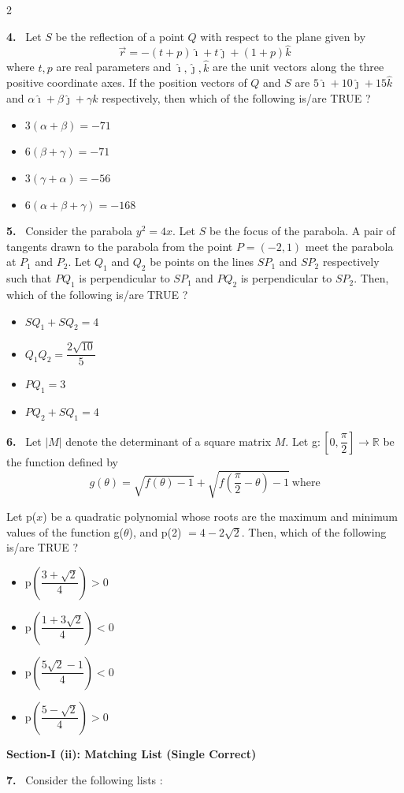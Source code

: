 \documentclass[10pt]{extarticle}
\newcommand{\sect}[1]{\par\smallskip\noindent\textbf{#1}\par}
\newcommand{\qn}[1]{\par\smallskip\noindent\textbf{#1.}~}
\newenvironment{qoptions}{\begin{itemize}[leftmargin=1.8em,itemsep=1pt,topsep=2pt,label={}]}{\end{itemize}}
\newcommand{\opt}[2]{\item[(#1)] #2}
\begin{document}
\begin{multicols}{2}
\qn{4} Let $S$ be the reflection of a point $Q$ with respect to the plane given by
\[\vec r = -(t+p)\hat\imath + t\hat\jmath + (1+p)\hat k\]
where $t,p$ are real parameters and $\hat\imath,\hat\jmath,\hat k$ are the unit vectors along the three positive coordinate axes. If the position vectors of $Q$ and $S$ are $5\hat\imath+10\hat\jmath+15\hat k$ and $\alpha\hat\imath+\beta\hat\jmath+\gamma\hat k$ respectively, then which of the following is/are TRUE ?
\begin{qoptions}
\opt{A}{$3(\alpha+\beta) = -71$}
\opt{B}{$6(\beta+\gamma) = -71$}
\opt{C}{$3(\gamma+\alpha) = -56$}
\opt{D}{$6(\alpha+\beta+\gamma) = -168$}
\end{qoptions}

\qn{5} Consider the parabola $y^2=4x$. Let $S$ be the focus of the parabola. A pair of tangents drawn to the parabola from the point $P=(-2,1)$ meet the parabola at $P_1$ and $P_2$. Let $Q_1$ and $Q_2$ be points on the lines $SP_1$ and $SP_2$ respectively such that $PQ_1$ is perpendicular to $SP_1$ and $PQ_2$ is perpendicular to $SP_2$. Then, which of the following is/are TRUE ?
\begin{qoptions}
\opt{A}{$SQ_1+SQ_2 = 4$}
\opt{B}{$Q_1Q_2 = \dfrac{2\sqrt{10}}{5}$}
\opt{C}{$PQ_1 = 3$}
\opt{D}{$PQ_2+SQ_1 = 4$}
\end{qoptions}

\qn{6} Let $|M|$ denote the determinant of a square matrix $M$. Let g$:\left[0,\dfrac{\pi}{2}\right]\to\mathbb R$ be the function defined by
\[g(\theta) = \sqrt{f(\theta)-1} + \sqrt{f\left(\dfrac{\pi}{2}-\theta\right)-1}\ \text{where}\]
\par\noindent{}\par
Let p($x$) be a quadratic polynomial whose roots are the maximum and minimum values of the function g($\theta$), and p(2) $=4-2\sqrt2$. Then, which of the following is/are TRUE ?
\begin{qoptions}
\opt{A}{p$\left(\dfrac{3+\sqrt2}{4}\right)>0$}
\opt{B}{p$\left(\dfrac{1+3\sqrt2}{4}\right)<0$}
\opt{C}{p$\left(\dfrac{5\sqrt2-1}{4}\right)<0$}
\opt{D}{p$\left(\dfrac{5-\sqrt2}{4}\right)>0$}
\end{qoptions}

\sect{Section-I (ii): Matching List (Single Correct)}

\qn{7} Consider the following lists :
\end{multicols}
\end{document}
